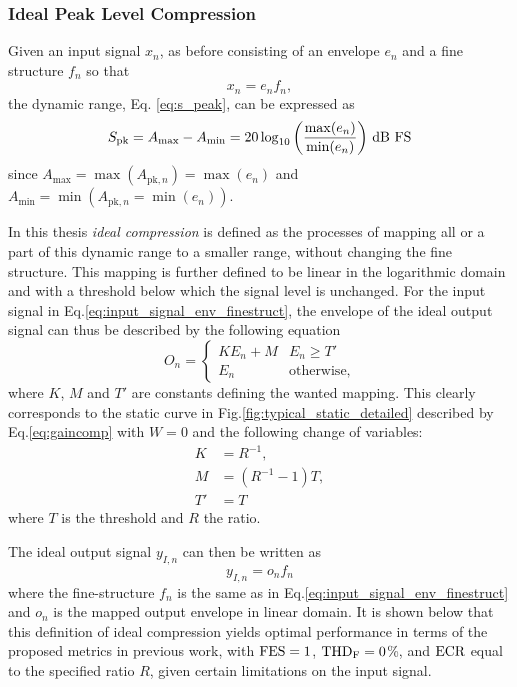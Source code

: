 \documentclass[../main2.tex]{subfiles}
\begin{document}
\FloatBarrier
\subsubsection{Ideal Peak Level Compression}
\label{method_ideal_peak_compression}
Given an input signal $x_n$, as before consisting of an envelope $e_n$ and a fine structure $f_n$ so that
\begin{equation}\label{eq:input_signal_env_finestruct}
x_n = e_n f_n,
\end{equation}
the dynamic range, Eq. \eqref{eq:s_peak}, can be expressed as
\begin{equation}
S_\text{pk} =A_\text{max} - A_\text{min} = 20 \log_{10} \left(\frac{\max(e_n)}{\min(e_n)}\right) \mskip3mu\text{dB FS}
\end{equation}
since $A_\text{max} = \max(A_{\text{pk},n}) = \max(e_n)$ and $A_\text{min} =  \min(A_{\text{pk},n}=\min(e_n))$.
 
In this thesis \emph{ideal compression} is defined as the processes of mapping all or a part of this dynamic range to a smaller range, without changing the fine structure. This mapping is further defined to be linear in the logarithmic domain and with a threshold below which the signal level is unchanged. For the input signal in Eq.\eqref{eq:input_signal_env_finestruct}, the envelope of the ideal output signal can thus be described by the following equation
\begin{equation}\label{eq:dynamic_range_mapping}
O_n =
\begin{cases}
	K E_n + M 					& E_n \geq T'  \\
	E_n							& \text{otherwise},
\end{cases} 
\end{equation}\label{eq:ideal_output_envelope}
where $K$, $M$ and $T'$ are constants defining the wanted mapping. This clearly corresponds to the static curve in Fig.\ref{fig:typical_static_detailed} described by Eq.\eqref{eq:gaincomp} with $W=0$ and the following change of variables:
\begin{equation}
\begin{split}
K &= R^{-1}, \\
M &= (R^{-1}-1)T,\\
T' &= T
\end{split}
\end{equation}
where $T$ is the threshold and $R$ the ratio.

The ideal output signal $y_{I,n}$ can then be written as
\begin{equation}\label{eq:ideal_output}
y_{I,n} = o_n f_n
\end{equation}
where the fine-structure $f_n$ is the same as in Eq.\eqref{eq:input_signal_env_finestruct} and $o_n$ is the mapped output envelope in linear domain. It is shown below that this definition of ideal compression yields optimal performance in terms of the proposed metrics in previous work, with $\text{FES} = 1$, $\text{THD}_\text{F}=0$\%, and $\text{ECR}$ equal to the specified ratio $R$, given certain limitations on the input signal.
\end{document}
